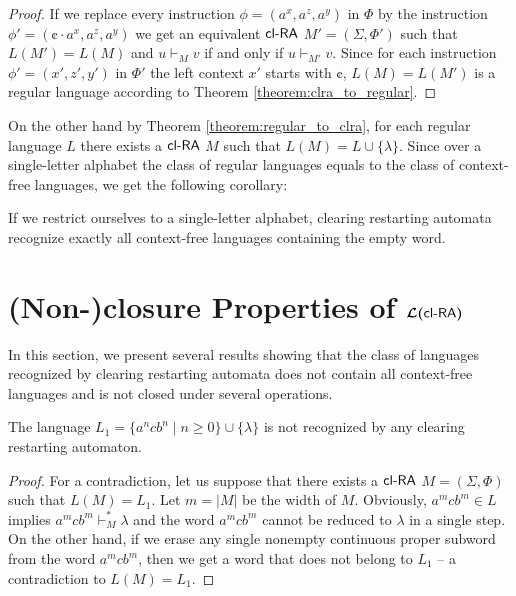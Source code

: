 \begin{proof}
If we replace every instruction $\phi = (a^x, a^z, a^y)$ in $\Phi$ by the instruction $\phi' = (\cent \cdot a^x, a^z, a^y)$ we get an equivalent $\textup{\sf cl-RA\/}$ $M' = (\Sigma, \Phi')$ such that $L(M')=L(M)$ and $u \vdash_M v$ if and only if $u \vdash_{M'} v$. Since for each instruction $\phi' = (x', z', y')$ in $\Phi'$ the left context $x'$ starts with $\cent$, $L(M) = L(M')$ is a regular language according to Theorem \ref{theorem:clra_to_regular}.
\end{proof}

On the other hand by Theorem \ref{theorem:regular_to_clra}, for each regular language $L$ there exists a $\textup{\sf cl-RA\/}$ $M$ such that $L(M) = L \cup \{\lambda\}$. Since over a single-letter alphabet the class of regular languages equals to the class of context-free languages, we get the following corollary:

\begin{corollary}
If we restrict ourselves to a single-letter alphabet, clearing restarting automata recognize exactly all context-free languages containing the empty word.
\end{corollary}

\section[\texorpdfstring{(Non-)closure Properties of ${\mathcal L}(\clRA)$}%
                        {(Non-)closure Properties of L(cl-RA)}]%
                        {(Non-)closure Properties of $\bm{{\mathcal L}(\textup{\sf cl-RA\/})}$}\label{se:nonClosureclRA}

In this section, we present several results showing that the class of languages recognized by clearing restarting automata does not contain all context-free languages and is not closed under several operations.

\begin{theorem}\label{theorem:L_1}
The language $L_1 = \{a^ncb^n \mid n \ge 0\} \cup \{\lambda\}$ is not recognized by any clearing restarting automaton.
\end{theorem}

\begin{proof}
For a contradiction, let us suppose that there exists a $\textup{\sf cl-RA\/}$ $M = (\Sigma,\Phi)$ such that $L(M) = L_1$. Let $m = |M|$ be the width of $M$. Obviously, $a^m c b^m \in L$ implies $a^m c b^m \vdash_M^* \lambda$ and the word $a^m c b^m$ cannot be reduced to $\lambda$ in a single step. On the other hand, if we erase any single nonempty continuous proper subword from the word $a^m c b^m$, then  we get a word that does not belong to $L_1$ -- a contradiction to $L(M) = L_1$.
\end{proof}

